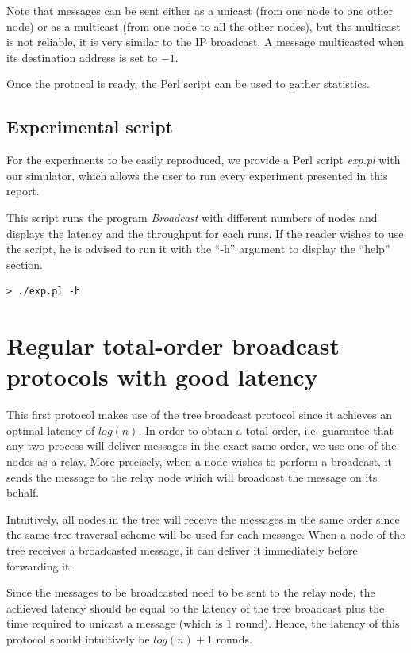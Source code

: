 \documentclass[a4paper]{article}
\begin{document}
Note that messages can be sent either as a unicast (from one node to one other
node) or as a multicast (from one node to all the other nodes), but the
multicast is not reliable, it is very similar to the IP broadcast. A message
multicasted when its destination address is set to $-1$.

Once the protocol is ready, the Perl script can be used to gather statistics.

\subsection{Experimental script}
For the experiments to be easily reproduced, we provide a Perl script
\textit{exp.pl} with our simulator, which allows the user to run every
experiment presented in this report.

This script runs the program \textit{Broadcast} with different numbers of
nodes and displays the latency and the throughput for each runs. If the reader
wishes to use the script, he is advised to run it with the ``-h'' argument to
display the ``help'' section.

\begin{lstlisting}
> ./exp.pl -h
\end{lstlisting}

\section{Regular total-order broadcast protocols with good latency}
\label{sec:latencyTO}

This first protocol makes use of the tree broadcast protocol since it achieves
an optimal latency of $log(n)$. In order to obtain a total-order, i.e.
guarantee that any two process will deliver messages in the exact same order,
we use one of the nodes as a relay. More precisely, when a node wishes to
perform a broadcast, it sends the message to the relay node which will
broadcast the message on its behalf.

Intuitively, all nodes in the tree will receive the messages in the same order
since the same tree traversal scheme will be used for each message. When a
node of the tree receives a broadcasted message, it can deliver it immediately
before forwarding it.

Since the messages to be broadcasted need to be sent to the relay node, the
achieved latency should be equal to the latency of the tree broadcast plus
the time required to unicast a message (which is $1$ round). Hence, the
latency of this protocol should intuitively be $log(n) + 1$ rounds.
\end{document}
